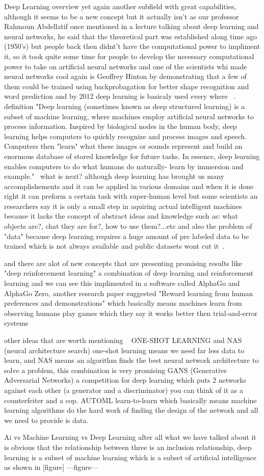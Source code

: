 Deep Learning
    overview
        yet again another subfield with great capabilities, although it seems to be a new concept but it actually isn't as our professor Rahmoun Abdellatif once mentioned in a lecture talking about deep learning and neural networks, he said that the theoretical part was established along time ago (1950's) but people back then didnt't have the computational power to impliment it, so it took quite some time for people to develop the necessary computational power to take on artificial neural networks and one of the scientists whi made neural networks cool again is Geoffrey Hinton by demonstrating that a few of them could be trained using backprobagation for better shape recognition and word prediction and by 2012 deep learning is basicaly used every where ~\cite{dl}.
    definition
        "Deep learning (sometimes known as deep structured learning) is a subset of machine learning, where machines employ artificial neural networks to process information. Inspired by biological nodes in the human body, deep learning helps computers to quickly recognize and process images and speech. Computers then "learn" what these images or sounds represent and build an enormous database of stored knowledge for future tasks. In essence, deep learning enables computers to do what humans do naturally- learn by immersion and example."~\cite{dl}
    what is next?
        although deep learning has brought us many accomplishements and it can be applied in various domains and when it is done right it can preform a certain task with super-human level but some scientists an researchers say it is only a small step in aquiring actual intelligent machines because it lacks the concept of abstract ideas and knowledge such as: what objects are?, chat they are for?, how to use them?...etc
        and also the problem of "data" because deep learning requires a huge amount of pre labeled data to be trained which is not always available and public datasets wont cut it~\cite{dl}.

        and there are alot of new concepts that are presenting promising results like "deep reinforcement learning" a combination of deep learning and reinforcement learning and we can see this implimented in a software called AlphaGo and AlphaGo Zero, another research paper suggested  "Reward learning from human preferences and demonstrations" which basically means machines learn from observing humans play games which they say it works better then trial-and-error systems~\cite{dl}

        other ideas that are worth mentioning ~\cite{dl}
            ONE-SHOT LEARNING and NAS (neural architecture search)
                one-shot learning means we need far less data to learn, and NAS means an algorithm finds the best neural network architecture to solve a problem, this combination is very promising
            GANS (Generative Adversarial Networks)
                a competition for deep learning which puts 2 networks against each other (a generator and a discriminator) you can think of it as a counterfeiter and a cop.
            AUTOML
                learn-to-learn which basically means machine learning algorithms do the hard work of finding the design of the network and all we need to provide is data.


Ai vs Machine Learning vs Deep Learning
    after all what we have talked about it is obvious that the relationship between three is an inclusion relationship, deep learning is a subset of machine learning which is a subset of artificial intelligence as shown in [figure] 
---figure---